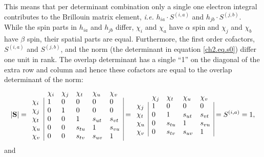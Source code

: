 This means that per determinant combination only a single one electron integral contributes to the Brillouin matrix element, \textit{i.e.} $h_{ia} \cdot S^{(i,a)}$ and $h_{jb} \cdot S^{(j,b)}$. While the spin parts in $h_{ia}$ and $h_{jb}$ differ, $\chi_i$ and $\chi_a$ have $\alpha$ spin and $\chi_j$ and $\chi_b$ have $\beta$ spin, their spatial parts are equal. Furthermore, the first order cofactors, $S^{(i,a)}$ and $S^{(j,b)}$, and the norm (the determinant in equation \ref{ch2.eq.s0}) differ one unit in rank. The overlap determinant has a single ``1'' on the diagonal of the extra row and column and hence these cofactors are equal to the overlap determinant of the norm:
\begin{equation}
|\mathbf{S}| =
\begin{array}{llllll}
 &  \chi_i & \chi_j & \chi_t & \chi_u & \chi_v \\
 \chi_i & \multicolumn{1}{|l}{ 1 } & 0 & 0 & 0 & \multicolumn{1}{l|}{ 0 } \\
 \chi_j & \multicolumn{1}{|l}{ 0 } & 1 & 0 & 0 & \multicolumn{1}{l|}{ 0 } \\
 \chi_t & \multicolumn{1}{|l}{ 0 } & 0 & 1 & s_{ut} & \multicolumn{1}{l|}{s_{vt}} \\
 \chi_u & \multicolumn{1}{|l}{ 0 } & 0 & s_{tu} & 1 & \multicolumn{1}{l|}{s_{vu}} \\
 \chi_v & \multicolumn{1}{|l}{ 0 } & 0 & s_{tv} & s_{uv} & \multicolumn{1}{l|}{1}
\end{array}=
\begin{array}{lllll}
 &  \chi_j & \chi_t & \chi_u & \chi_v \\
 \chi_j & \multicolumn{1}{|l}{ 1 } & 0 & 0 & \multicolumn{1}{l|}{ 0 } \\
 \chi_t & \multicolumn{1}{|l}{ 0 } & 1 & s_{ut} & \multicolumn{1}{l|}{ s_{vt} } \\
 \chi_u & \multicolumn{1}{|l}{ 0 } & s_{tu} & 1 & \multicolumn{1}{l|}{s_{vu}} \\
 \chi_v & \multicolumn{1}{|l}{ 0 } & s_{tv} & s_{uv} & \multicolumn{1}{l|}{1}
\end{array}=
S^{(i,a)}=1,
\label{ch2.eq.sissia}
\end{equation}
and
